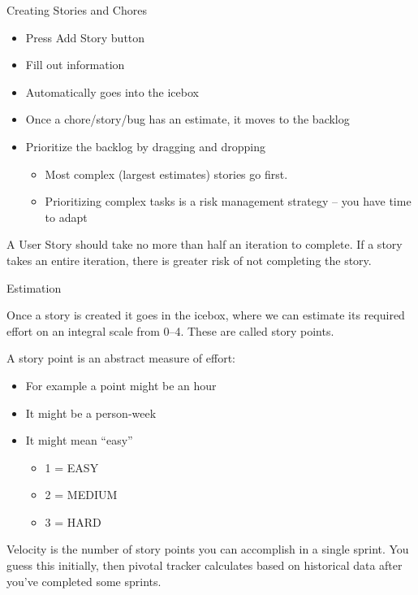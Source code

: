 \documentclass{beamer}
\begin{document}
\begin{frame}[fragile]{Creating Stories and Chores}

\begin{itemize}
\item Press Add Story button
\item Fill out information
\item Automatically goes into the icebox
\item Once a chore/story/bug has an estimate, it moves to the backlog
\item Prioritize the backlog by dragging and dropping
\begin{itemize}
\item Most complex (largest estimates) stories go first.
\item Prioritizing complex tasks is a risk management strategy -- you have time to adapt
\end{itemize}
\end{itemize}
A User Story should take no more than half an iteration to complete.  If a story takes an entire iteration, there is greater risk of not completing the story.

\end{frame}

\begin{frame}[fragile]{Estimation}


Once a story is created it goes in the icebox, where we can estimate its required effort on an integral scale from 0--4.  These are called story points.

A story point is an abstract measure of effort:
\begin{itemize}
\item For example a point might be an hour
\item It might be a person-week
\item It might mean ``easy''
\begin{itemize}
\item 1 = EASY
\item 2  = MEDIUM
\item 3 = HARD
\end{itemize}
\end{itemize}
Velocity is the number of story points you can accomplish in a single sprint.  You guess this initially, then pivotal tracker calculates based on historical data after you've completed some sprints.

\end{frame}
\end{document}
